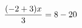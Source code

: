 \documentclass[preview]{standalone}
\begin{document}
\begin{align*}
\special{dvisvgm:raw <g id='unique000'>}\frac{(-2 + 3) x}{3} = 8 - 20\special{dvisvgm:raw </g>}
\end{align*}
\end{document}
